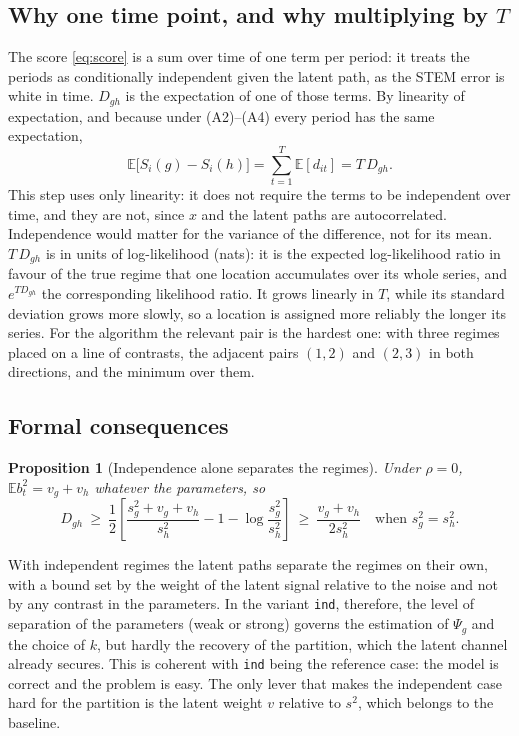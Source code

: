 \documentclass[11pt]{article}
\newcommand{\E}{\mathbb{E}}
\newtheorem{proposition}{Proposition}
\begin{document}
\subsection{Why one time point, and why multiplying by $T$}

The score \eqref{eq:score} is a sum over time of one term per period: it treats the periods as conditionally independent given the latent path, as the STEM error is white in time. $D_{gh}$ is the expectation of one of those terms. By linearity of expectation, and because under (A2)--(A4) every period has the same expectation,
\begin{equation}\label{eq:T}
  \E\bigl[S_i(g) - S_i(h)\bigr] = \sum_{t=1}^T \E[d_{it}] = T\, D_{gh}.
\end{equation}
This step uses only linearity: it does not require the terms to be independent over time, and they are not, since $x$ and the latent paths are autocorrelated. Independence would matter for the variance of the difference, not for its mean. $T\, D_{gh}$ is in units of log-likelihood (nats): it is the expected log-likelihood ratio in favour of the true regime that one location accumulates over its whole series, and $e^{T D_{gh}}$ the corresponding likelihood ratio. It grows linearly in $T$, while its standard deviation grows more slowly, so a location is assigned more reliably the longer its series. For the algorithm the relevant pair is the hardest one: with three regimes placed on a line of contrasts, the adjacent pairs $(1,2)$ and $(2,3)$ in both directions, and the minimum over them.

\subsection{Formal consequences}

\begin{proposition}[Independence alone separates the regimes]\label{prop:indep}
Under $\rho = 0$, $\E b_t^2 = v_g + v_h$ whatever the parameters, so
\[
  D_{gh} \ \ge\ \frac12\left[\frac{s^2_g + v_g + v_h}{s^2_h} - 1 - \log\frac{s^2_g}{s^2_h}\right] \ \ge\ \frac{v_g + v_h}{2 s^2_h} \quad \text{when } s^2_g = s^2_h .
\]
\end{proposition}
With independent regimes the latent paths separate the regimes on their own, with a bound set by the weight of the latent signal relative to the noise and not by any contrast in the parameters. In the variant \texttt{ind}, therefore, the level of separation of the parameters (weak or strong) governs the estimation of $\Psi_g$ and the choice of $k$, but hardly the recovery of the partition, which the latent channel already secures. This is coherent with \texttt{ind} being the reference case: the model is correct and the problem is easy. The only lever that makes the independent case hard for the partition is the latent weight $v$ relative to $s^2$, which belongs to the baseline.
\end{document}
